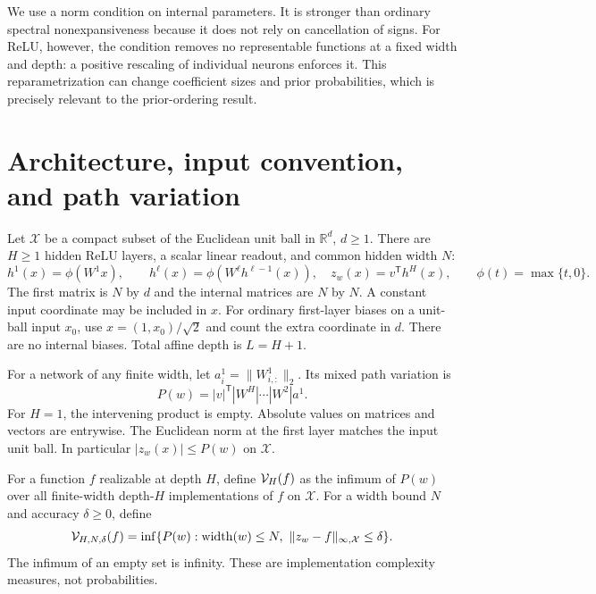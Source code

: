 \documentclass[11pt]{article}
\theoremstyle{definition}\newtheorem{definition}[theorem]{Definition}
\theoremstyle{remark}\newtheorem{remark}[theorem]{Remark}
\newcommand{\R}{\mathbb R}\newcommand{\E}{\mathbb E}\newcommand{\Prob}{\mathbb P}
\begin{document}
We use a norm condition on internal parameters. It is stronger than ordinary spectral nonexpansiveness because it does not rely on cancellation of signs. For ReLU, however, the condition removes no representable functions at a fixed width and depth: a positive rescaling of individual neurons enforces it. This reparametrization can change coefficient sizes and prior probabilities, which is precisely relevant to the prior-ordering result.

\section{Architecture, input convention, and path variation}
Let $\mathcal X$ be a compact subset of the Euclidean unit ball in $\R^d$, $d\ge1$. There are $H\ge1$ hidden ReLU layers, a scalar linear readout, and common hidden width $N$:
\[
 h^1(x)=\phi(W^1x),\qquad h^\ell(x)=\phi(W^\ell h^{\ell-1}(x)),\quad
 z_w(x)=v^{\mathsf T}h^H(x),\qquad\phi(t)=\max\{t,0\}.
\]
The first matrix is $N$ by $d$ and the internal matrices are $N$ by $N$. A constant input coordinate may be included in $x$. For ordinary first-layer biases on a unit-ball input $x_0$, use $x=(1,x_0)/\sqrt2$ and count the extra coordinate in $d$. There are no internal biases. Total affine depth is $L=H+1$.

For a network of any finite width, let $a^1_i=\|W^1_{i,:}\|_2$. Its mixed path variation is
\begin{equation}
 P(w)=|v|^{\mathsf T}|W^H|\cdots|W^2|a^1.
 \label{eq:pathnorm}
\end{equation}
For $H=1$, the intervening product is empty. Absolute values on matrices and vectors are entrywise. The Euclidean norm at the first layer matches the input unit ball. In particular $|z_w(x)|\le P(w)$ on $\mathcal X$.

For a function $f$ realizable at depth $H$, define $\mathcal V_H(f)$ as the infimum of $P(w)$ over all finite-width depth-$H$ implementations of $f$ on $\mathcal X$. For a width bound $N$ and accuracy $\delta\ge0$, define
\begin{equation}
 \mathcal V_{H,N,\delta}(f)=
 \inf\{P(w):\operatorname{width}(w)\le N,\ \|z_w-f\|_{\infty,\mathcal X}\le\delta\}.
 \label{eq:approx-variation}
\end{equation}
The infimum of an empty set is infinity. These are implementation complexity measures, not probabilities.
\end{document}
